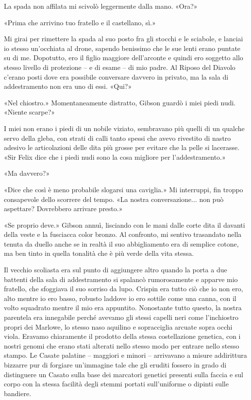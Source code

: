 La spada non affilata mi scivolò leggermente dalla mano. «Ora?»

«Prima che arrivino tuo fratello e il castellano, sì.»

Mi girai per rimettere la spada al suo posto fra gli stocchi e le
sciabole, e lanciai io stesso un'occhiata al drone, sapendo benissimo
che le sue lenti erano puntate su di me. Dopotutto, ero il figlio
maggiore dell'arconte e quindi ero soggetto allo stesso livello di
protezione -- e di esame -- di mio padre. Al Riposo del Diavolo c'erano
posti dove era possibile conversare davvero in privato, ma la sala di
addestramento non era uno di essi. «Qui?»

«Nel chiostro.» Momentaneamente distratto, Gibson guardò i miei piedi
nudi. «Niente scarpe?»

I miei non erano i piedi di un nobile viziato, sembravano più quelli di
un qualche servo della gleba, con strati di calli tanto spessi che avevo
rivestito di nastro adesivo le articolazioni delle dita più grosse per
evitare che la pelle si lacerasse. «Sir Felix dice che i piedi nudi sono
la cosa migliore per l'addestramento.»

«Ma davvero?»

«Dice che così è meno probabile slogarsi una caviglia.» Mi interruppi,
fin troppo consapevole dello scorrere del tempo. «La nostra
conversazione... non può aspettare? Dovrebbero arrivare presto.»

«Se proprio deve.» Gibson annuì, lisciando con le mani dalle corte dita
il davanti della veste e la fusciacca color bronzo. Al confronto, mi
sentivo trasandato nella tenuta da duello anche se in realtà il suo
abbigliamento era di semplice cotone, ma ben tinto in quella tonalità
che è più verde della vita stessa.

Il vecchio scoliasta era sul punto di aggiungere altro quando la porta a
due battenti della sala di addestramento si spalancò rumorosamente e
apparve mio fratello, che sfoggiava il suo sorriso da lupo. Crispin era
tutto ciò che io non ero, alto mentre io ero basso, robusto laddove io
ero sottile come una canna, con il volto squadrato mentre il mio era
appuntito. Nonostante tutto questo, la nostra parentela era innegabile
perché avevamo gli stessi capelli neri come l'inchiostro propri dei
Marlowe, lo stesso naso aquilino e sopracciglia arcuate sopra occhi
viola. Eravamo chiaramente il prodotto della stessa costellazione
genetica, con i nostri genomi che erano stati alterati nello stesso modo
per entrare nello stesso stampo. Le Casate palatine -- maggiori e minori
-- arrivavano a misure addirittura bizzarre pur di forgiare un'immagine
tale che gli eruditi fossero in grado di distinguere un Casato sulla
base dei marcatori genetici presenti sulla faccia e sul corpo con la
stessa facilità degli stemmi portati sull'uniforme o dipinti sulle
bandiere.

